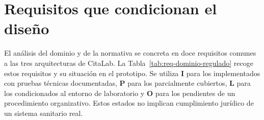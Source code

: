\section{Requisitos que condicionan el diseño}
\label{sec:requisitos-diseno}

El análisis del dominio y de la normativa se concreta en doce requisitos comunes a las tres arquitecturas de CitaLab. La Tabla~\ref{tab:req-dominio-regulado} recoge estos requisitos y su situación en el prototipo. Se utiliza \textbf{I} para los implementados con pruebas técnicas documentadas, \textbf{P} para los parcialmente cubiertos, \textbf{L} para los condicionados al entorno de laboratorio y \textbf{O} para los pendientes de un procedimiento organizativo. Estos estados no implican cumplimiento jurídico de un sistema sanitario real.

\small
\setlength{\tabcolsep}{3pt}
